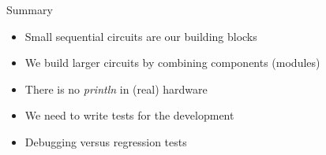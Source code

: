 \begin{frame}[fragile]{Summary}
\begin{itemize}
\item Small sequential circuits are our building blocks
\item We build larger circuits by combining components (modules)
\item There is no \emph{println} in (real) hardware
\item We need to write tests for the development
\item Debugging versus regression tests
\end{itemize}
\end{frame}




